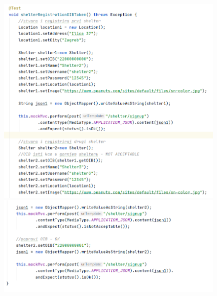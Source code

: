 		
			\begin{figure}[H]
				\centerline{
			 	\includegraphics[scale=0.73]{slike/shelter1.1.PNG}}
		 		\hspace*{-0.21in}
		 		\includegraphics[scale=0.73]{slike/shelter1.2.PNG}
			 	\centering
			 \end{figure}
			
		 
		 

